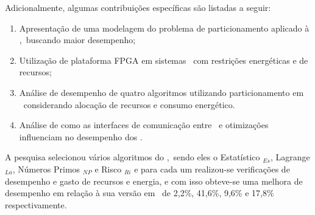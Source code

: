     Adicionalmente, algumas contribuições específicas são listadas a seguir:
    
    \begin{enumerate}
        \item 
        
        Apresentação de uma modelagem do problema de particionamento aplicado à \wearables,\ buscando maior desempenho;
        
        \item 
        Utilização de plataforma FPGA em sistemas \wearables\ com restrições energéticas e de recursos;
        
        
        \item %
        Análise de desempenho de quatro algoritmos utilizando particionamento em \hardware\ considerando alocação de recursos e consumo energético.
        
        \item 
        Análise de como as interfaces de comunicação entre \hs\ e otimizações influenciam no desempenho dos \wearables.
        
    \end{enumerate}
    
    A pesquisa selecionou vários algoritmos do \wearable,\ sendo eles o Estatístico \Ss$_{Es}$, Lagrange \Ss$_{La}$, Números Primos \Ss$_{NP}$ e Risco \Ss$_{Ri}$ e para cada um realizou-se verificações de desempenho e gasto de recursos e energia, e com isso obteve-se uma melhora de desempenho em relação à sua versão em \software\ de 2,2\%, 41,6\%, 9,6\% e 17,8\% respectivamente.
    
    
    
